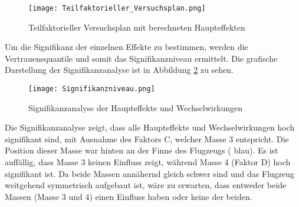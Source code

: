     \begin{figure}[H]
        \centering
        \texttt{[image: Teilfaktorieller\_Versuchsplan.png]}
        \caption{Teilfaktorieller Versuchsplan mit berechneten Haupteffekten}
        \label{fig: Teilfaktorieller_Versuchsplan}
    \end{figure}
    
    \noindent
    Um die Signifikanz der einzelnen Effekte zu bestimmen, werden die
    Vertrauensquantile und somit das Signifikanzniveau ermittelt.
    Die grafische Darstellung der Signifikanzanalyse ist in Abbildung
    \ref{fig: Signifikanzniveau} zu sehen.
    
    \begin{figure}[H]
        \centering
        \texttt{[image: Signifikanzniveau.png]}
        \caption{Signifikanzanalyse der Haupteffekte und Wechselwirkungen}
        \label{fig: Signifikanzniveau}
    \end{figure}

    \noindent
    Die Signifikanzanalyse zeigt, dass alle Haupteffekte und Wechselwirkungen hoch signifikant sind, 
    mit Ausnahme des Faktors C, welcher Masse 3 entspricht. Die Position dieser
    Masse war hinten an der Finne des Flugzeugs ( blau\grqq). 
    Es ist auffällig, dass Masse 3 keinen Einfluss zeigt, während Masse 4
    (Faktor D) hoch signifikant ist. Da beide Massen annähernd gleich schwer sind
    und das Flugzeug weitgehend symmetrisch aufgebaut ist, wäre zu erwarten,
    dass entweder beide Massen (Masse 3 und 4) einen Einfluss haben oder
    keine der beiden.  